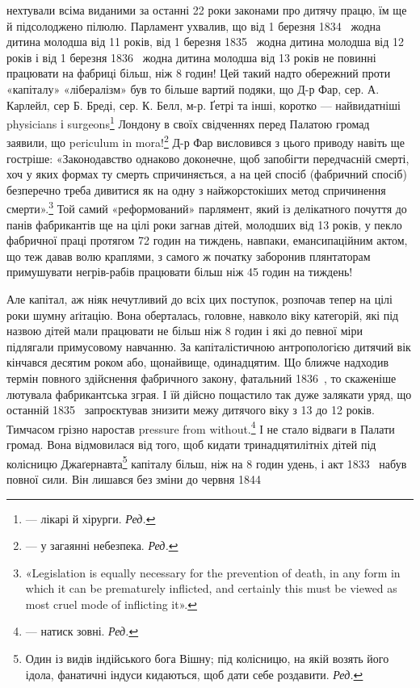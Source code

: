 \parcont{}  %
нехтували всіма виданими за останні 22 роки законами про дитячу
працю, їм ще й підсолоджено пілюлю. Парламент ухвалив, що
від 1 березня 1834~ жодна дитина молодша від 11 років, від
1 березня 1835~ жодна дитина молодша від 12 років і від 1 березня
1836~ жодна дитина молодша від 13 років не повинні
працювати на фабриці більш, ніж 8 годин! Цей такий надто обережний
проти «капіталу» «лібералізм» був то більше вартий
подяки, що Д-р Фар, сер. А. Карлейл, сер Б. Бреді, сер. К. Белл,
м-р. Ґетрі та інші, коротко — найвидатніші physicians і surgeons\footnote*{
— лікарі й хірурги. \emph{Ред.}
} Лондону в своїх свідченнях перед Палатою громад заявили, що
periculum in mora!\footnote*{
— у загаянні небезпека. \emph{Ред.}
} Д-р Фар висловився з цього приводу навіть
ще гостріше: «Законодавство однаково доконечне, щоб запобігти
передчасній смерті, хоч у яких формах ту смерть спричиняється,
а на цей спосіб (фабричний спосіб) безперечно треба дивитися
як на одну з найжорстокіших метод спричинення смерти».\footnote{
«Legislation is equally necessary for the prevention of death, in
any form in which it can be prematurely inflicted, and certainly this must
be viewed as most cruel mode of inflicting it».
}
Той самий «реформований» парлямент, який із делікатного почуття
до панів фабрикантів ще на цілі роки загнав дітей, молодших
від 13 років, у пекло фабричної праці протягом 72 годин на
тиждень, навпаки, емансипаційним актом, що теж давав волю
краплями, з самого ж початку заборонив плянтаторам примушувати
негрів-рабів працювати більш ніж 45 годин на тиждень!

Але капітал, аж ніяк нечутливий до всіх цих поступок, розпочав
тепер на цілі роки шумну аґітацію. Вона оберталась, головне,
навколо віку категорій, які під назвою дітей мали працювати
не більш ніж 8 годин і які до певної міри підлягали примусовому
навчанню. За капіталістичною антропологією дитячий
вік кінчався десятим роком або, щонайвище, одинадцятим. Що
ближче надходив термін повного здійснення фабричного закону,
фатальний 1836~, то скаженіше лютувала фабрикантська зграя.
І їй дійсно пощастило так дуже залякати уряд, що останній
1835~ запроєктував знизити межу дитячого віку з 13 до 12 років.
Тимчасом грізно наростав pressure from without.\footnote*{
— натиск зовні. \emph{Ред.}
} І не стало відваги
в Палати громад. Вона відмовилася від того, щоб кидати
тринадцятилітніх дітей під колісницю Джаґернавта\footnote*{
Один із видів індійського бога Вішну; під колісницю, на якій возять
його ідола, фанатичні індуси кидаються, щоб дати себе роздавити. \emph{Ред.}
} капіталу
більш, ніж на 8 годин удень, і акт 1833~ набув повної сили.
Він лишався без зміни до червня 1844~

